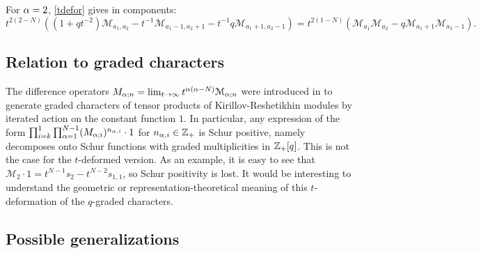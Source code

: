 \begin{example}
For ${\alpha}=2$, \eqref{tdefor} gives in components:
$$t^{2(2-N)}\left((1+qt^{-2}){\mathcal M}_{a_1,a_2} -t^{-1}{\mathcal M}_{a_1-1,a_2+1}-t^{-1}q{\mathcal M}_{a_1+1,a_2-1}\right)
=t^{2(1-N)}\left( {\mathcal M}_{a_1}{\mathcal M}_{a_2}-q {\mathcal M}_{a_1+1}{\mathcal M}_{a_2-1}\right).$$
\end{example}



\subsection{Relation to graded characters}

The difference operators $M_{{\alpha};n}=\lim_{t\to\infty} t^{{\alpha}({\alpha}-N)} {\mathcal M}_{{\alpha};n}$ 
were introduced in \cite{DFK15} to generate graded characters of tensor products of Kirillov-Reshetikhin modules
by iterated action on the constant function $1$.
In particular, any expression of the form $\prod_{i=k}^1 \prod_{{\alpha}=1}^{N-1} (M_{{\alpha};i})^{n_{{\alpha},i}} \cdot 1$
 for $n_{{\alpha},i}\in {\mathbb Z}_+$
is Schur positive, namely decomposes onto Schur functions with graded multiplicities in ${\mathbb Z}_+[q]$.
This is not the case for the $t$-deformed version. As an example, it is easy to see that
${\mathcal M}_2\cdot 1=t^{N-1} s_2 -t^{N-2} s_{1,1}$, so Schur positivity is lost. It would be interesting to understand the geometric or representation-theoretical meaning of this $t$-deformation of the $q$-graded characters.

\subsection{Possible generalizations}

